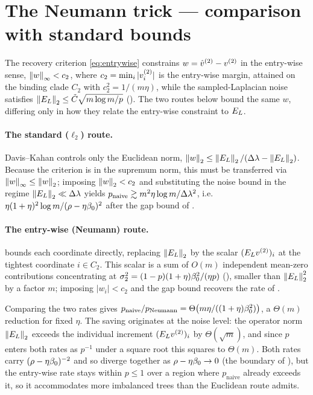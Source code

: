 \section{The Neumann trick --- comparison with standard bounds}\label{app:compare}

The recovery criterion \eqref{eq:entrywise} constrains $w=\hat v^{(2)}-v^{(2)}$ in the
entry-wise sense, $\left\lVert w \right\rVert_\infty<c_2$, where $c_2=\min_i|v^{(2)}_i|$ is the
entry-wise margin, attained on the binding clade $C_2$ with $c_2^2=1/(m\eta)$, while
the sampled-Laplacian noise satisfies $\left\lVert E_{L} \right\rVert_{2}\le\tilde C\sqrt{m\log
m/p}$ (). The two routes below bound the same $w$, differing
only in how they relate the entry-wise constraint to $E_{L}$.

\paragraph{The standard ($\ell_2$) route.} Davis--Kahan controls only the Euclidean
norm, $\left\lVert w \right\rVert_2\le\left\lVert E_{L} \right\rVert_{2}/(\Delta\lambda-\left\lVert E_{L} \right\rVert_{2})$. Because the criterion is in
the supremum norm, this must be transferred via $\left\lVert w \right\rVert_\infty\le\left\lVert w \right\rVert_2$;
imposing $\left\lVert w \right\rVert_2<c_2$ and substituting the noise bound in the regime
$\left\lVert E_{L} \right\rVert_{2}\ll\Delta\lambda$ yields $p_{\mathrm{naive}}\gtrsim m^2\eta\log m/\Delta\lambda^2$,
i.e.\ $\eta(1+\eta)^2\log m/(\rho-\eta\beta_0)^2$ after the gap bound of .

\paragraph{The entry-wise (Neumann) route.}  bounds each
coordinate directly, replacing $\left\lVert E_{L} \right\rVert_{2}$ by the scalar $(E_{L}v^{(2)})_i$ at the
tightest coordinate $i\in C_2$. This scalar is a sum of $O(m)$ independent mean-zero
contributions concentrating at $\sigma_2^2=(1-p)(1+\eta)\beta_0^2/(\eta p)$
(), smaller than $\left\lVert E_{L} \right\rVert_{2}^2$ by a factor $m$; imposing
$|w_i|<c_2$ and the gap bound recovers the rate of .

\begin{remark}\label{rem:E-compare}
Comparing the two rates gives
$p_{\mathrm{naive}}/p_{\mathrm{Neumann}}=\Theta\bigl(m\eta/((1+\eta)\beta_0^2)\bigr)$,
a $\Theta(m)$
reduction for fixed $\eta$. The saving originates at the noise level: the operator
norm $\left\lVert E_{L} \right\rVert_{2}$ exceeds the individual increment $(E_{L}v^{(2)})_i$ by
$\Theta(\sqrt m)$, and since $p$ enters both rates as $p^{-1}$ under a square root
this squares to $\Theta(m)$. Both rates carry $(\rho-\eta\beta_0)^{-2}$ and so
diverge together as $\rho-\eta\beta_0\to0$ (the boundary of ), but the
entry-wise rate stays within $p\le1$ over a region where $p_{\mathrm{naive}}$
already exceeds it, so it accommodates more imbalanced trees than the Euclidean
route admits.
\end{remark}
